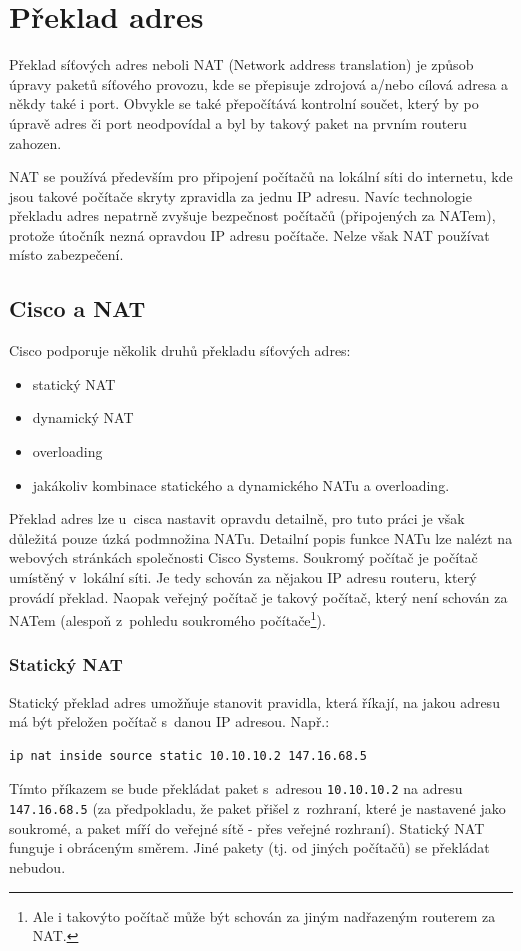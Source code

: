 \section{Překlad adres}

Překlad síťových adres neboli NAT (Network address translation) je způsob úpravy paketů síťového provozu, kde se přepisuje zdrojová a/nebo cílová adresa a někdy také i port. Obvykle se také přepočítává kontrolní součet, který by po úpravě adres či port neodpovídal a byl by takový paket na prvním routeru zahozen.

NAT se používá především pro připojení počítačů na lokální síti do internetu, kde jsou takové počítače skryty zpravidla za jednu IP adresu. Navíc technologie překladu adres nepatrně zvyšuje bezpečnost počítačů (připojených za NATem), protože útočník nezná opravdou IP adresu  počítače. Nelze však NAT používat místo zabezpečení.


\subsection{Cisco a NAT}
Cisco podporuje několik druhů překladu síťových adres:\cite{cisco:druhy}

\begin{itemize}
\item statický NAT
\item dynamický NAT
\item overloading
\item jakákoliv kombinace statického a dynamického NATu a overloading.
\end{itemize}

Překlad adres lze u~cisca nastavit opravdu detailně, pro tuto práci je však důležitá pouze úzká podmnožina NATu. Detailní popis funkce NATu lze nalézt na webových stránkách společnosti Cisco Systems\cite{cisco:nat}.
Soukromý počítač je počítač umístěný v~lokální síti. Je tedy schován za nějakou IP adresu routeru, který provádí překlad. Naopak veřejný počítač je takový počítač, který není schován za NATem (alespoň z~pohledu soukromého počítače\footnote{Ale i takovýto počítač může být schován za jiným nadřazeným routerem za NAT.}).

\subsubsection{Statický NAT}
Statický překlad adres umožňuje stanovit pravidla, která říkají, na jakou adresu má být přeložen počítač s~danou IP adresou. Např.:
\begin{verbatim}
ip nat inside source static 10.10.10.2 147.16.68.5
\end{verbatim} 
Tímto příkazem se bude překládat paket s~adresou \verb|10.10.10.2| na adresu \verb|147.16.68.5| (za předpokladu, že paket přišel z~rozhraní, které je nastavené jako soukromé, a paket míří do veřejné sítě - přes veřejné rozhraní). Statický NAT funguje i obráceným směrem. Jiné pakety (tj. od jiných počítačů) se překládat nebudou. 

